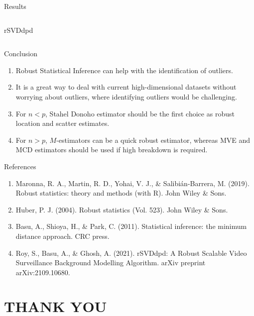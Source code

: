 \documentclass[10pt,xcolor=svgnames]{beamer} %
\begin{document}
\begin{frame}{Results}
\begin{columns}
{            {\centering rSVDdpd}
        }
    \end{columns}
\end{frame}

\begin{frame}{Conclusion}
    \begin{enumerate}
        \item Robust Statistical Inference can help with the identification of outliers.
        \item It is a great way to deal with current high-dimensional datasets without worrying about outliers, where identifying outliers would be challenging.
        \item For $n < p$, Stahel Donoho estimator should be the first choice as robust location and scatter estimates.
        \item For  $n > p$, $M$-estimators can be a quick robust estimator, whereas MVE and MCD estimators should be used if high breakdown is required.
    \end{enumerate}
\end{frame}

\begin{frame}{References}
    \begin{enumerate}
        \item Maronna, R. A., Martin, R. D., Yohai, V. J., \& Salibi\'{a}n-Barrera, M. (2019). Robust statistics: theory and methods (with R). John Wiley \& Sons.
        \item Huber, P. J. (2004). Robust statistics (Vol. 523). John Wiley \& Sons.
        \item Basu, A., Shioya, H., \& Park, C. (2011). Statistical inference: the minimum distance approach. CRC press.
        \item Roy, S., Basu, A., \& Ghosh, A. (2021). rSVDdpd: A Robust Scalable Video Surveillance Background Modelling Algorithm. arXiv preprint arXiv:2109.10680.
    \end{enumerate}
\end{frame}

\section*{THANK YOU}
\end{document}
